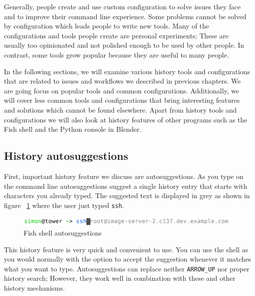 \documentclass[thesis=M,english]{FITthesis}[2012/10/20]
\newcommand{\tmpframe}[1]{\fbox{#1}}
\renewcommand{\tmpframe}[1]{#1}
\let\myRef\ref
\renewcommand\ref{\unskip~\myRef}
\begin{document}
Generally, people create and use custom configuration to solve issues they face and to improve their command line experience. Some problems cannot be solved by configuration which leads people to write new tools. Many of the configurations and tools people create are personal experiments; These are usually too opinionated and not polished enough to be used by other people. In contrast, some tools grow popular because they are useful to many people. 

In the following sections, we will examine various history tools and configurations that are related to issues and workflows we described in previous chapters. We are going focus on popular tools and common configurations. Additionally, we will cover less common tools and configurations that bring interesting features and solutions which cannot be found elsewhere. Apart from history tools and configurations we will also look at history features of other programs such as the Fish shell and the Python console in Blender. 



\subsection{History autosuggestions}

First, important history feature we discuss are autosuggestions. As you type on the command line autosuggestions suggest a single history entry that starts with characters you already typed. The suggested text is displayed in grey as shown in figure \ref{fish-autosuggestions} where the user just typed \verb|ssh|.  


\begin{figure}[h!]
  \tmpframe{\includegraphics[width=\linewidth]{figures/existing-tools/xterm-fish-autosuggestions.pdf}}
  \caption{Fish shell autosuggestions}
  \label{fish-autosuggestions}
\end{figure}


This history feature is very quick and convenient to use. You can use the shell as you would normally with the option to accept the suggestion whenever it matches what you want to type. Autosuggestions can replace neither \verb|ARROW_UP| nor proper history search; However, they work well in combination with these and other history mechanisms.
\end{document}
